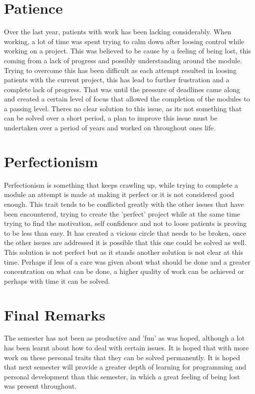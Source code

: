 \documentclass{scrartcl}
\begin{document}
\section{Patience}

Over the last year, patients with work has been lacking considerably. When working, a lot of time was spent trying to calm down after loosing control while working on a project. This was believed to be cause by a feeling of being lost, this coming from a lack of progress and possibly understanding around the module. Trying to overcome this has been difficult as each attempt resulted in loosing patients with the current project, this has lead to further frustration and a complete lack of progress. That was until the pressure of deadlines came along and created a certain level of focus that allowed the completion of the modules to a passing level. Theres no clear solution to this issue, as its not something that can be solved over a short period, a plan to improve this issue must be undertaken over a period of years and worked on throughout ones life.

\section{Perfectionism}

Perfectionism is something that keeps crawling up, while trying to complete a module an attempt is made at making it perfect or it is not considered good enough. This trait tends to be conflicted greatly with the other issues that have been encountered, trying to create the 'perfect' project while at the same time trying to find the motivation, self confidence and not to loose patients is proving to be less than easy. It has created a vicious circle that needs to be broken, once the other issues are addressed it is possible that this one could be solved as well. This solution is not perfect but as it stands another solution is not clear at  this time. Perhaps if less of a care was given about what should be done and a greater concentration on what can be done, a higher quality of work can be achieved or perhaps with time it can be solved.

\section{Final Remarks}

The semester has not been as productive and 'fun' as was hoped, although a lot has been learnt about how to deal with certain issues. It is hoped that with more work on these personal traits that they can be solved permanently. It is hoped that next semester will provide a greater depth of learning for programming and personal development than this semester, in which a great feeling of being lost was present throughout.



\end{document}

